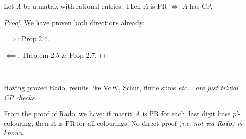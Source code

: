 \documentclass[10pt]{article}
\begin{document}
\begin{theorem}
    Let $A$ be a matrix with rational entries. Then $A$ is PR $\iff$ $A$ has CP.
\end{theorem}
\begin{proof} We have proven both directions already:

    \underline{$\implies$}: Prop 2.4.

    \underline{$\impliedby$}: Theorem 2.5 \& Prop 2.7.
\end{proof}

\begin{remark*}[Remarks]\ 
    \item Having proved Rado, results like VdW, Schur, finite sums \it{etc}... are just trivial CP checks.
    \item From the proof of Rado, we have: if matrix $A$ is PR for each `last digit base $p$'-colouring, then $A$ is PR for all colourings. No direct proof (\it{i.e.} not via Rado) is known.    
\end{remark*}
\end{document}
